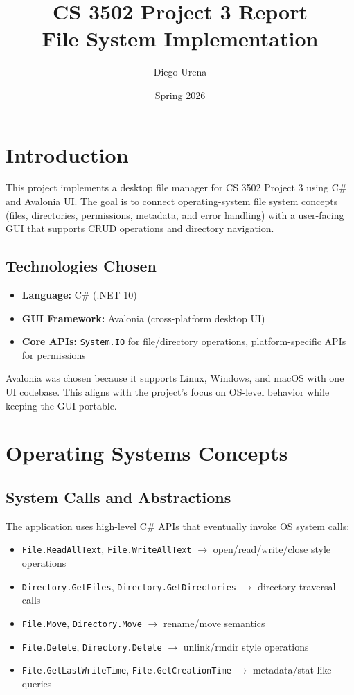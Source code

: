\documentclass[11pt]{article}
\title{CS 3502 Project 3 Report\\\large File System Implementation}
\author{Diego Urena}
\date{Spring 2026}
\begin{document}
\maketitle

\section{Introduction}
This project implements a desktop file manager for CS 3502 Project 3 using C\# and Avalonia UI. The goal is to connect operating-system file system concepts (files, directories, permissions, metadata, and error handling) with a user-facing GUI that supports CRUD operations and directory navigation.

\subsection*{Technologies Chosen}
\begin{itemize}
  \item \textbf{Language:} C\# (.NET 10)
  \item \textbf{GUI Framework:} Avalonia (cross-platform desktop UI)
  \item \textbf{Core APIs:} \texttt{System.IO} for file/directory operations, platform-specific APIs for permissions
\end{itemize}

Avalonia was chosen because it supports Linux, Windows, and macOS with one UI codebase. This aligns with the project's focus on OS-level behavior while keeping the GUI portable.

\section{Operating Systems Concepts}
\subsection*{System Calls and Abstractions}
The application uses high-level C\# APIs that eventually invoke OS system calls:
\begin{itemize}
  \item \texttt{File.ReadAllText}, \texttt{File.WriteAllText} $\rightarrow$ open/read/write/close style operations
  \item \texttt{Directory.GetFiles}, \texttt{Directory.GetDirectories} $\rightarrow$ directory traversal calls
  \item \texttt{File.Move}, \texttt{Directory.Move} $\rightarrow$ rename/move semantics
  \item \texttt{File.Delete}, \texttt{Directory.Delete} $\rightarrow$ unlink/rmdir style operations
  \item \texttt{File.GetLastWriteTime}, \texttt{File.GetCreationTime} $\rightarrow$ metadata/stat-like queries
\end{itemize}
\end{document}
